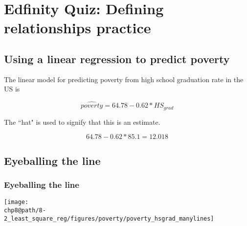 \documentclass[slidestop,compress,mathserif]{beamer}
\makeatletter
\newcommand{\soln}[1]{\textit{#1}}
\def\chp8@path{../../Chp 8}
\makeatother
\begin{document}

\section{Edfinity Quiz: Defining relationships practice}


\subsection{Using a linear regression to predict poverty}


\begin{frame}

The linear model for predicting poverty from high school graduation rate in the US is

\[ \hat{poverty} = 64.78 - 0.62 * HS_{grad} \]

The ``hat" is used to signify that this is an estimate.

\end{frame}


\begin{frame}


\pause

\[ 64.78 - 0.62 * 85.1 = 12.018 \]

\end{frame}


\subsection{Eyeballing the line}


\begin{frame}
\frametitle{Eyeballing the line}

{
\soln{}
}
{
\begin{center}
\texttt{[image: \\chp8@path/8-2\_least\_square\_reg/figures/poverty/poverty\_hsgrad\_manylines]}
\end{center}
}
\end{frame}
\end{document}
